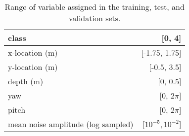 \begin{table}
    \centering
    \begin{tabular}[htb]{|l|r|}
    \hline
    class & [0, 4] \\ \hline
    x-location (m) & [-1.75, 1.75] \\ \hline
    y-location (m) & [-0.5, 3.5] \\ \hline
    depth (m) & [0, 0.5] \\ \hline
    yaw & [0, 2$\pi$] \\ \hline
    pitch & [0, 2$\pi$] \\ \hline
    mean noise amplitude (log sampled) & [$10^{-5}, 10^{-2}$] \\ \hline
    \end{tabular}
    \caption{Range of variable assigned in the training, test, and validation sets.}
    \label{tab:parameter-ranges}
\end{table}
